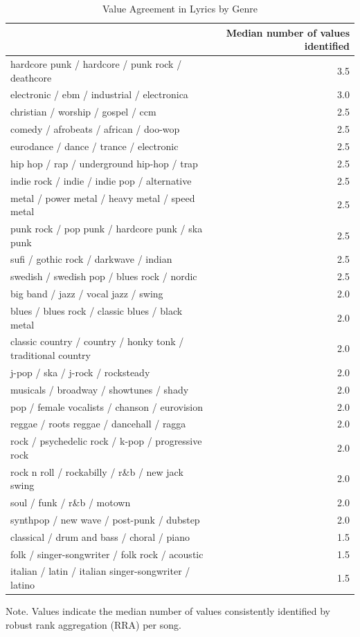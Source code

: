 \begin{table}
\caption*{
{\large Value Agreement in Lyrics by Genre}
} 
\fontsize{12.0pt}{14.4pt}\selectfont
\begin{tabular*}{\linewidth}{@{\extracolsep{\fill}}l|r}
\toprule
 & Median number of values identified \\ 
\midrule\addlinespace[2.5pt]
hardcore punk / hardcore / punk rock / deathcore & 3.5 \\ 
electronic / ebm / industrial / electronica & 3.0 \\ 
christian / worship / gospel / ccm & 2.5 \\ 
comedy / afrobeats / african / doo-wop & 2.5 \\ 
eurodance / dance / trance / electronic & 2.5 \\ 
hip hop / rap / underground hip-hop / trap & 2.5 \\ 
indie rock / indie / indie pop / alternative & 2.5 \\ 
metal / power metal / heavy metal / speed metal & 2.5 \\ 
punk rock / pop punk / hardcore punk / ska punk & 2.5 \\ 
sufi / gothic rock / darkwave / indian & 2.5 \\ 
swedish / swedish pop / blues rock / nordic & 2.5 \\ 
big band / jazz / vocal jazz / swing & 2.0 \\ 
blues / blues rock / classic blues / black metal & 2.0 \\ 
classic country / country / honky tonk / traditional country & 2.0 \\ 
j-pop / ska / j-rock / rocksteady & 2.0 \\ 
musicals / broadway / showtunes / shady & 2.0 \\ 
pop / female vocalists / chanson / eurovision & 2.0 \\ 
reggae / roots reggae / dancehall / ragga & 2.0 \\ 
rock / psychedelic rock / k-pop / progressive rock & 2.0 \\ 
rock n roll / rockabilly / r\&b / new jack swing & 2.0 \\ 
soul / funk / r\&b / motown & 2.0 \\ 
synthpop / new wave / post-punk / dubstep & 2.0 \\ 
classical / drum and bass / choral / piano & 1.5 \\ 
folk / singer-songwriter / folk rock / acoustic & 1.5 \\ 
italian / latin / italian singer-songwriter / latino & 1.5 \\ 
\bottomrule
\end{tabular*}
\begin{minipage}{\linewidth}
Note. Values indicate the median number of values consistently identified by robust rank aggregation (RRA) per song.\\
\end{minipage}
\end{table}

